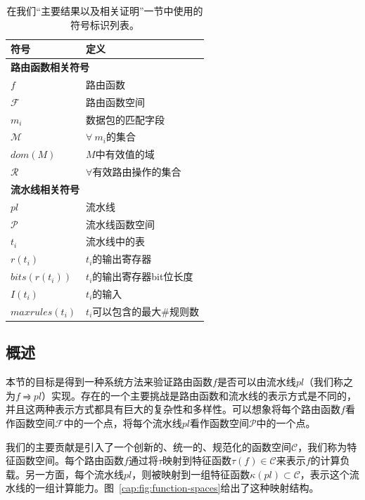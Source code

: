\begin{table}
\centering
\begin{tabular}{ l | l }
  \hline
  \textbf{符号} & \textbf{定义}\\
  \hline
  \hline
  \multicolumn{2}{l}{\textbf{路由函数相关符号}} \\
  \hline
  $f$ & 路由函数\\
  $\mathcal{F}$ & 路由函数空间\\
  $m_i$ & 数据包的匹配字段\\
  $\mathcal{M}$ & $\forall\ m_i$的集合\\
  $dom(M)$ &  $M$中有效值的域\\
  $\mathcal{R}$ &  $\forall$有效路由操作的集合\\ 
  \hline
  \hline
  \multicolumn{2}{l}{\textbf{流水线相关符号}} \\
  \hline
  $pl$ & 流水线\\
  $\mathcal{P}$ & 流水线函数空间\\
  $t_i$ & 流水线中的表\\
  $r(t_i)$ & $t_i$的输出寄存器\\
  $bits(r(t_i))$ & $t_i$的输出寄存器bit位长度\\
  $I(t_i)$ & $t_i$的输入\\
  $maxrules(t_i)$ & $t_i$可以包含的最大$\#$规则数\\
  \hline
\end{tabular}
\vspace{2mm}
\caption{在我们``主要结果以及相关证明''一节中使用的符号标识列表。}
\label{cap:tbl:sym-table}
\end{table}

\subsection{概述}
本节的目标是得到一种系统方法来验证路由函数$f$是否可以由流水线$pl$（我们称之为$f \rightrightharpoons pl$）实现。存在的一个主要挑战是路由函数和流水线的表示方式是不同的，并且这两种表示方式都具有巨大的复杂性和多样性。可以想象将每个路由函数$f$看作函数空间$\mathcal{F}$中的一个点，将每个流水线$pl$看作函数空间$\mathcal{P}$中的一个点。 

我们的主要贡献是引入了一个创新的、统一的、规范化的函数空间$\mathcal{C}$，我们称为特征函数空间。每个路由函数$f$通过将$\tau$映射到特征函数$\tau(f) \in \mathcal{C}$来表示$f$的计算负载。另一方面，每个流水线$pl$，则被映射到一组特征函数$\kappa(pl) \subset \mathcal{C}$，表示这个流水线的一组计算能力。图~\ref{cap:fig:function-spaces}给出了这种映射结构。

